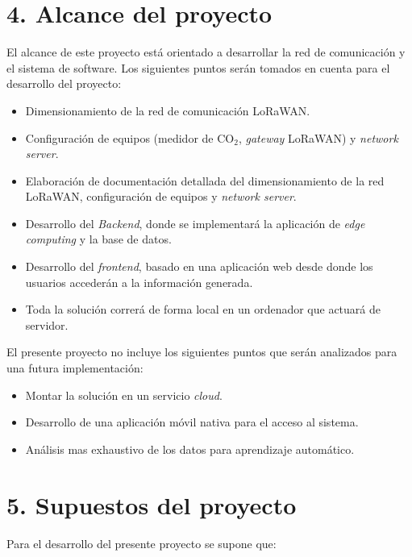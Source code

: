 \documentclass[
11pt, %
]{charter}
\begin{document}
\section{4. Alcance del proyecto}
\label{sec:alcance}
El alcance de este proyecto está orientado a desarrollar la red de comunicación y el sistema de software. Los siguientes puntos serán tomados en cuenta para el desarrollo del proyecto:
\begin{itemize}
	\item Dimensionamiento de la red de comunicación LoRaWAN.
	\item Configuración de equipos (medidor de CO$_{2}$, \textit{gateway} LoRaWAN) y \textit{network server}. 
	\item Elaboración de documentación detallada del dimensionamiento de la red LoRaWAN, configuración de equipos y \textit{network server}.
	\item Desarrollo del \textit{Backend}, donde se implementará la aplicación de \textit{edge computing} y la base de datos.
	\item Desarrollo del \textit{frontend}, basado en una aplicación web desde donde los usuarios accederán a la información generada.
	\item Toda la solución correrá de forma local en un ordenador que actuará de servidor.
\end{itemize}

El presente proyecto no incluye los siguientes puntos que serán analizados para una futura implementación:
\begin{itemize}
	\item Montar la solución en un servicio \textit{cloud}.
	\item Desarrollo de una aplicación móvil nativa para el acceso al sistema.
	\item Análisis mas exhaustivo de los datos para aprendizaje automático.
\end{itemize}
	

\section{5. Supuestos del proyecto}
\label{sec:supuestos}
Para el desarrollo del presente proyecto se supone que:
\end{document}
